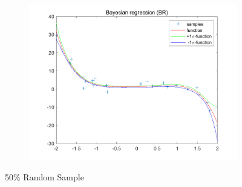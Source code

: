 \documentclass{article}
\begin{document}
\begin{figure}[H]
\begin{subfigure}[b]{0.475\textwidth}
        \includegraphics[width=\textwidth]{fig/1c-50-br.png} 
    \end{subfigure}
    \caption{50\% Random Sample}
\end{figure}
\end{document}
